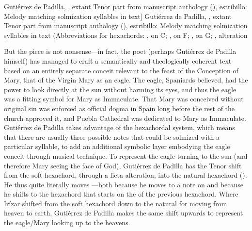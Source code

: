
\begin{musicexample}
\caption
    [Gutiérrez de Padilla, , extant Tenor part from
    manuscript anthology (), estribillo: Melody matching
    solmization syllables in text]
    {Gutiérrez de Padilla, , extant Tenor part from
    manuscript anthology (), estribillo: Melody matching
    solmization syllables in text (Abbreviations for hexachords: ,
     on C; ,  on F; ,
     on G; ,  alteration}
    
    \label{mus:Padilla-Miraba_el_sol-estribillo}
\end{musicexample}

But the piece is not nonsense---in fact, the poet (perhaps Gutiérrez de Padilla
himself) has managed to craft a semantically and theologically coherent text
based on an entirely separate conceit relevant to the feast of the Conception
of Mary, that of the Virgin Mary as an eagle.
The eagle, Spaniards believed, had the power to look directly at the sun
without harming its eyes, and thus the eagle was a fitting symbol for Mary as
Immaculate.%
    \Autocite[]{Covarrubias:Tesoro}
That Mary was conceived without original sin was enforced as official dogma in
Spain long before the rest of the church approved it, and Puebla Cathedral was
dedicated to Mary as Immaculate.
Gutiérrez de Padilla takes advantage of the hexachordal system, which means
that there are usually three possible notes that could be solmized with a
particular syllable, to add an additional symbolic layer embodying the eagle
conceit through musical technique.
To represent the eagle turning to the sun (and therefore Mary seeing the face
of God), Gutiérrez de Padilla has the Tenor shift from the soft hexachord,
through a ficta alteration, into the natural hexachord
().
He thus quite literally moves ---both because he moves to a
note on  and because he shifts to the hexachord that starts on the
 of the previous hexachord.
Where Irízar shifted from the soft hexachord down to the natural for moving from
heaven to earth, Gutiérrez de Padilla makes the same shift upwards to represent
the eagle/Mary looking up to the heavens.

